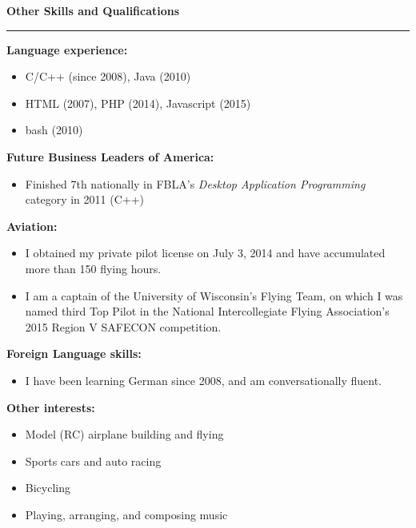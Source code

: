 \documentclass[12pt,letterpaper]{article}
\newenvironment{details}{
    \vspace{-.8em}
    \begin{itemize}
        \renewcommand \labelitemi{\labelitemiv}
        \setlength{\itemsep}{0pt}
        \setlength{\parskip}{-1pt}
        \setlength{\parsep}{0pt}
    }{
    \end{itemize}
    \vspace{-.5em}
}
\newcommand{\hr} {
    \vspace{-1em}
    \par\rule{\textwidth}{1pt}
    \vspace{-1.5em}
}
\newcommand{\ressection}[1] {
    \par{\large \textbf{#1}}
    \hr
}
\newenvironment{other} {
    \ressection{Other Skills and Qualifications}
    \setlength{\parskip}{3pt}
}{
    \vspace{0.5em}
}
\begin{document}
\begin{other}
\par \textbf{Language experience:}
\begin{details}
    \item C/C++ (since 2008), Java (2010)
    \item HTML (2007), PHP (2014), Javascript (2015)
    \item bash (2010)
\end{details}
\par \textbf{Future Business Leaders of America:}
\begin{details}
    \item Finished 7th nationally in FBLA's \textit{Desktop Application Programming} category in 2011 (C++)
\end{details}

\par \textbf{Aviation:}
\begin{details}
    \item I obtained my private pilot license on July 3, 2014 and have accumulated more than 150 flying hours.~
    \item I am a captain of the University of Wisconsin's Flying Team, on which I was named third Top Pilot in the National Intercollegiate Flying Association's 2015 Region V SAFECON competition.
\end{details}

\par \textbf{Foreign Language skills:}
\begin{details}
    \item I have been learning German since 2008, and am conversationally fluent.
\end{details}

\par \textbf{Other interests:}
\begin{details}
    \item Model (RC) airplane building and flying
    \item Sports cars and auto racing
    \item Bicycling
    \item Playing, arranging, and composing music
\end{details}

\end{other}
\end{document}
